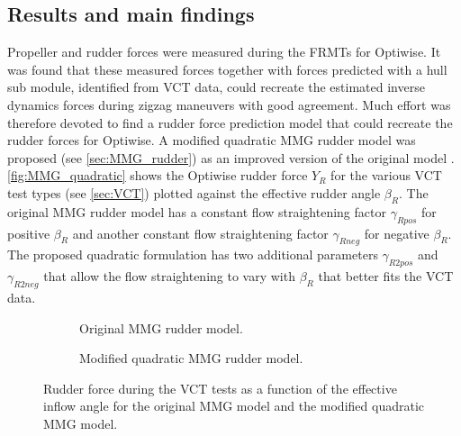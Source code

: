 \subsection*{Results and main findings}
Propeller and rudder forces were measured during the FRMTs for Optiwise. It was found that these measured forces together with forces predicted with a hull sub module, identified from VCT data, could recreate the estimated inverse dynamics forces during zigzag maneuvers with good agreement. Much effort was therefore devoted to find a rudder force prediction model that could recreate the rudder forces for Optiwise. A modified quadratic MMG rudder model was proposed (see \autoref{sec:MMG_rudder}) as an improved version of the original model \cite{yasukawaIntroductionMMGStandard2015}. 
\autoref{fig:MMG_quadratic} shows the Optiwise rudder force $Y_R$ for the various VCT test types (see \autoref{sec:VCT}) plotted against the effective rudder angle $\beta_R$. The original MMG rudder model has a constant flow straightening factor $\gamma_{Rpos}$ for positive $\beta_R$ and another constant flow straightening factor $\gamma_{Rneg}$ for negative $\beta_R$. The proposed quadratic formulation has two additional parameters $\gamma_{R2pos}$ and $\gamma_{R2neg}$ that allow the flow straightening to vary with $\beta_R$ that better fits the VCT data.
\begin{figure}[h]
     \centering
     \begin{subfigure}[b]{0.49\textwidth}
         \centering
         
        \caption{Original MMG rudder model.}
        \label{fig:Y_R_MMG_original}
     \end{subfigure}
     \hfill
     \begin{subfigure}[b]{0.49\textwidth}
         \centering
         
        \caption{Modified quadratic MMG rudder model.}
        \label{fig:Y_R_MMG_quadratic}
     \end{subfigure}
    \caption{Rudder force during the VCT tests as a function of the effective inflow angle for the original MMG model and the modified quadratic MMG model.}
    \label{fig:MMG_quadratic}
\end{figure}


